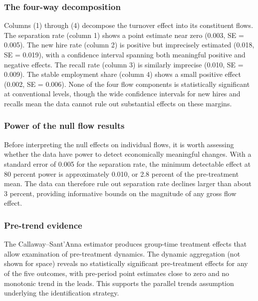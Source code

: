 \documentclass[12pt]{article}
\begin{document}
\subsubsection*{The four-way decomposition} Columns (1) through (4) decompose the turnover effect into its constituent flows. The separation rate (column 1) shows a point estimate near zero (0.003, SE = 0.005). The new hire rate (column 2) is positive but imprecisely estimated (0.018, SE = 0.019), with a confidence interval spanning both meaningful positive and negative effects. The recall rate (column 3) is similarly imprecise (0.010, SE = 0.009). The stable employment share (column 4) shows a small positive effect (0.002, SE = 0.006). None of the four flow components is statistically significant at conventional levels, though the wide confidence intervals for new hires and recalls mean the data cannot rule out substantial effects on these margins.

\subsubsection*{Power of the null flow results} Before interpreting the null effects on individual flows, it is worth assessing whether the data have power to detect economically meaningful changes. With a standard error of 0.005 for the separation rate, the minimum detectable effect at 80 percent power is approximately 0.010, or 2.8 percent of the pre-treatment mean. The data can therefore rule out separation rate declines larger than about 3 percent, providing informative bounds on the magnitude of any gross flow effect.

\subsubsection*{Pre-trend evidence} The Callaway--Sant'Anna estimator produces group-time treatment effects that allow examination of pre-treatment dynamics. The dynamic aggregation (not shown for space) reveals no statistically significant pre-treatment effects for any of the five outcomes, with pre-period point estimates close to zero and no monotonic trend in the leads. This supports the parallel trends assumption underlying the identification strategy.
\end{document}
